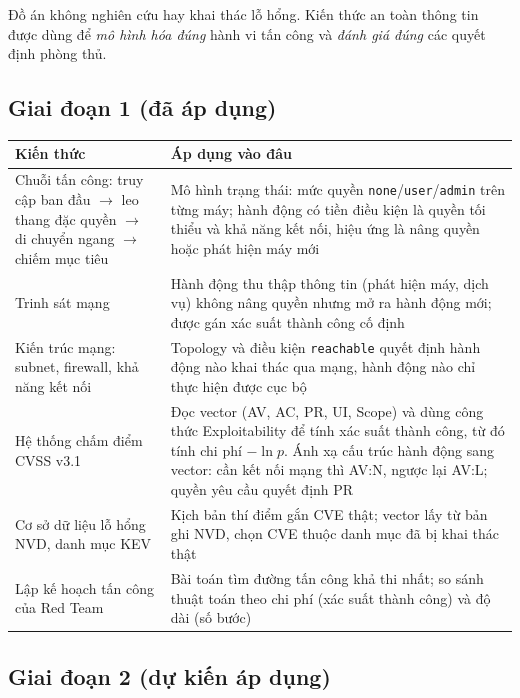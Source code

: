 \documentclass[11pt,a4paper]{article}
\begin{document}
Đồ án không nghiên cứu hay khai thác lỗ hổng. Kiến thức an toàn thông tin được dùng để \emph{mô hình hóa đúng} hành vi tấn công và \emph{đánh giá đúng} các quyết định phòng thủ.

\subsection{Giai đoạn 1 (đã áp dụng)}

\begin{center}
\begin{tabular}{@{}Y{4.4cm}Y{10.6cm}@{}}
\toprule
Kiến thức & Áp dụng vào đâu \\
\midrule
Chuỗi tấn công: truy cập ban đầu $\rightarrow$ leo thang đặc quyền $\rightarrow$ di chuyển ngang $\rightarrow$ chiếm mục tiêu & Mô hình trạng thái: mức quyền \texttt{none}/\texttt{user}/\texttt{admin} trên từng máy; hành động có tiền điều kiện là quyền tối thiểu và khả năng kết nối, hiệu ứng là nâng quyền hoặc phát hiện máy mới \\
Trinh sát mạng & Hành động thu thập thông tin (phát hiện máy, dịch vụ) không nâng quyền nhưng mở ra hành động mới; được gán xác suất thành công cố định \\
Kiến trúc mạng: subnet, firewall, khả năng kết nối & Topology và điều kiện \texttt{reachable} quyết định hành động nào khai thác qua mạng, hành động nào chỉ thực hiện được cục bộ \\
Hệ thống chấm điểm CVSS v3.1 & Đọc vector (AV, AC, PR, UI, Scope) và dùng công thức Exploitability để tính xác suất thành công, từ đó tính chi phí $-\ln p$. Ánh xạ cấu trúc hành động sang vector: cần kết nối mạng thì AV:N, ngược lại AV:L; quyền yêu cầu quyết định PR \\
Cơ sở dữ liệu lỗ hổng NVD, danh mục KEV & Kịch bản thí điểm gắn CVE thật; vector lấy từ bản ghi NVD, chọn CVE thuộc danh mục đã bị khai thác thật \\
Lập kế hoạch tấn công của Red Team & Bài toán tìm đường tấn công khả thi nhất; so sánh thuật toán theo chi phí (xác suất thành công) và độ dài (số bước) \\
\bottomrule
\end{tabular}
\end{center}

\subsection{Giai đoạn 2 (dự kiến áp dụng)}
\end{document}

